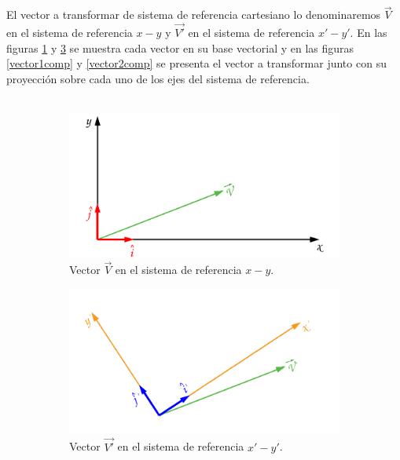 \documentclass[12pt,letterpaper]{article}
\begin{document}
%
%
El vector a transformar de sistema de referencia cartesiano lo denominaremos $\overset{\rightarrow}{V}$ en el sistema de referencia $x-y$ y $\overset{\rightarrow}{V'}$ en el sistema de referencia $x'-y'$. En las figuras \ref{vector1} y  \ref{vector2} se muestra cada vector en su base vectorial y en las  figuras \ref{vector1comp} y \ref{vector2comp} se presenta el vector a transformar junto con su proyección sobre cada uno de los ejes del sistema de referencia.\\\\
%
%
\begin{figure}[H]
	\centering
	\begin{subfigure}[l]{0.45\textwidth}
		\includegraphics[width=\textwidth]{img/Vector1.pdf}
		\caption{Vector $\overset{\rightarrow}{V}$ en el sistema de referencia $x-y$.}
		\label{vector1}
	\end{subfigure}
	\hspace{.5 cm}
	\begin{subfigure}[r]{0.45\textwidth}
		\includegraphics[width=\textwidth]{img/Vector2.pdf}
		\caption{Vector $\overset{\rightarrow}{V'}$ en el sistema de referencia $x'-y'$.}
		\label{vector2}
	\end{subfigure}	
	\caption{}
\end{figure}
%
\end{document}
